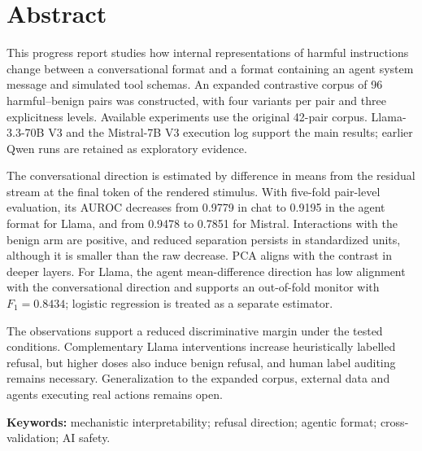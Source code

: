 \chapter*{Abstract}

This progress report studies how internal representations of harmful instructions change between a conversational format and a format containing an agent system message and simulated tool schemas. An expanded contrastive corpus of 96 harmful--benign pairs was constructed, with four variants per pair and three explicitness levels. Available experiments use the original 42-pair corpus. Llama-3.3-70B V3 and the Mistral-7B V3 execution log support the main results; earlier Qwen runs are retained as exploratory evidence.

The conversational direction is estimated by difference in means from the residual stream at the final token of the rendered stimulus. With five-fold pair-level evaluation, its AUROC decreases from 0.9779 in chat to 0.9195 in the agent format for Llama, and from 0.9478 to 0.7851 for Mistral. Interactions with the benign arm are positive, and reduced separation persists in standardized units, although it is smaller than the raw decrease. PCA aligns with the contrast in deeper layers. For Llama, the agent mean-difference direction has low alignment with the conversational direction and supports an out-of-fold monitor with $F_1=0.8434$; logistic regression is treated as a separate estimator.

The observations support a reduced discriminative margin under the tested conditions. Complementary Llama interventions increase heuristically labelled refusal, but higher doses also induce benign refusal, and human label auditing remains necessary. Generalization to the expanded corpus, external data and agents executing real actions remains open.

\vspace{0.4cm}\noindent
\textbf{Keywords:} mechanistic interpretability; refusal direction; agentic format; cross-validation; AI safety.
